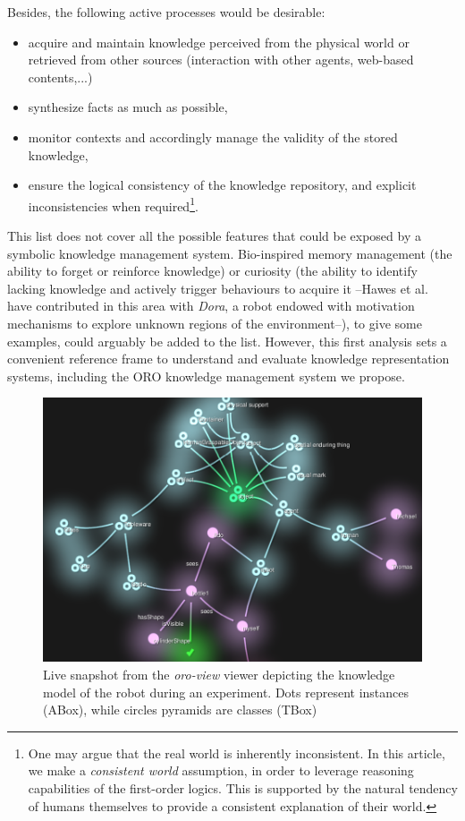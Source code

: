 \documentclass[twocolumn]{svjour3}
\begin{document}
Besides, the following active processes would be desirable:
\begin{itemize}
	\item acquire and maintain knowledge perceived from the physical world or
	retrieved from other sources (interaction with other agents, web-based contents,...)
	\item synthesize facts as much as possible,
	\item monitor contexts and accordingly manage the validity of the stored knowledge,
	\item ensure the logical consistency of the knowledge repository, and
	explicit inconsistencies when required\footnote{One may argue that the real world is 
	inherently inconsistent. In this article, we make a
	\textit{consistent world} assumption, in order to leverage reasoning
	capabilities of the first-order logics. This is supported by the natural
	tendency of humans themselves to provide a consistent explanation of their
	world.}.
\end{itemize}

This list does not cover all the possible features that could be exposed by a
symbolic knowledge management system. Bio-inspired memory management (the
ability to forget or reinforce knowledge) or curiosity (the ability to identify
lacking knowledge and actively trigger behaviours to acquire it --Hawes et
al.~\cite{Hawes2011} have contributed in this area with \emph{Dora}, a
robot endowed with motivation mechanisms to explore unknown regions of
the environment--), to give some examples, could arguably be added to the list.
However, this first analysis sets a convenient reference frame to understand
and evaluate knowledge representation systems, including the \textsc{ORO}
knowledge management system we propose.

\begin{figure}[!ht]
\centering
  \includegraphics[width=\columnwidth]{images/snapshot_oroview.png}
  \caption{Live snapshot from the \emph{oro-view} viewer depicting the
  knowledge model of the robot during an experiment. Dots represent
  instances (ABox), while circles pyramids are classes (TBox)}
  \label{fig|oro-view}
\end{figure}
\end{document}

